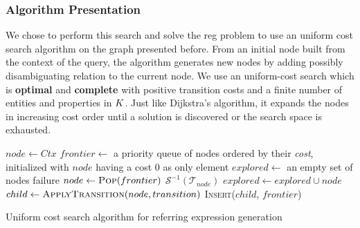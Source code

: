 \documentclass[a4paper,11pt,twoside]{StyleThese}
\begin{document}
\subsubsection{Algorithm Presentation}
We chose to perform this search and solve the \acrshort{reg} problem to use an uniform cost search algorithm on the graph presented before.
From an initial node built from the context of the query, the algorithm generates new nodes by adding possibly disambiguating relation to the current node. We use an uniform-cost search which is \textbf{optimal} and \textbf{complete} with positive transition costs and a finite number of entities and properties in $K$. Just like Dijkstra's algorithm, it expands the nodes in increasing cost order until a solution is discovered or the search space is exhausted.


\begin{algorithm}[htb]
\begin{algorithmic}[1]
\State $node \leftarrow Ctx$
\State $frontier \leftarrow$ a priority queue of nodes ordered by their \textit{cost}, initialized with $node$ having a cost 0 as only element
\State $explored \leftarrow$ an empty set of nodes
\Loop
		\State \Return failure		
	\EndIf
	\State $node \leftarrow \textsc{Pop}(frontier)$
		\State \Return $\mathcal{S}^{-1}(\mathcal{T}_{node})$
	\EndIf
	\State $explored \leftarrow explored \cup node$
		\State $child \leftarrow \textsc{ApplyTransition}(node, transition)$
			\State \textsc{Insert}($child$, $frontier$)
		\EndIf
	\EndFor
\EndLoop
\EndFunction
\end{algorithmic}
 \caption{Uniform cost search algorithm for referring expression generation}
 \label{alg:reg}
\end{algorithm}
\end{document}
